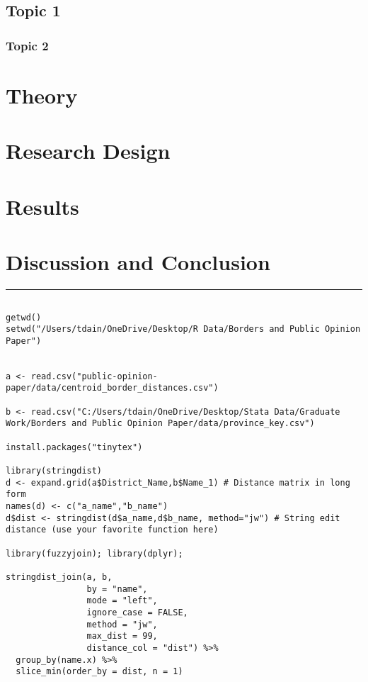 \documentclass[11pt,]{article}
\begin{document}
\subsection{Topic 1}\label{topic-1}

\subsubsection{Topic 2}\label{topic-2}

\section{Theory}\label{theory}

\section{Research Design}\label{research-design}

\section{Results}\label{results}

\section{Discussion and Conclusion}\label{discussion-and-conclusion}

\begin{center}\rule{0.5\linewidth}{0.5pt}\end{center}

\begin{verbatim}

getwd()
setwd("/Users/tdain/OneDrive/Desktop/R Data/Borders and Public Opinion Paper")


a <- read.csv("public-opinion-paper/data/centroid_border_distances.csv")

b <- read.csv("C:/Users/tdain/OneDrive/Desktop/Stata Data/Graduate Work/Borders and Public Opinion Paper/data/province_key.csv")

install.packages("tinytex")

library(stringdist)
d <- expand.grid(a$District_Name,b$Name_1) # Distance matrix in long form
names(d) <- c("a_name","b_name")
d$dist <- stringdist(d$a_name,d$b_name, method="jw") # String edit distance (use your favorite function here)

library(fuzzyjoin); library(dplyr);

stringdist_join(a, b, 
                by = "name",
                mode = "left",
                ignore_case = FALSE, 
                method = "jw", 
                max_dist = 99, 
                distance_col = "dist") %>%
  group_by(name.x) %>%
  slice_min(order_by = dist, n = 1)

\end{verbatim}
\end{document}
